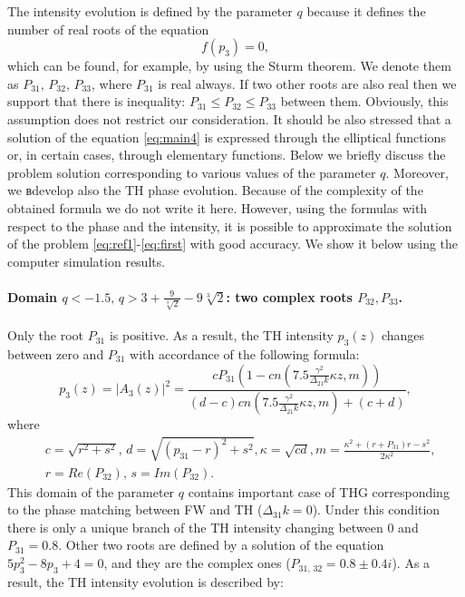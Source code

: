 \documentclass[a4paper, 12pt, onecolumn]{extarticle}
\begin{document}
The intensity evolution is defined by the parameter $q$ because it defines the number of real roots of the equation
$$
f(p_3)=0,
$$
which can be found, for example, by using the Sturm theorem. We  denote them as
$P_{31},\,P_{32},\,P_{33}$, where $P_{31}$ is  real always. If two other roots are also real then we support that there is inequality:   $P_{31}\le P_{32}\le P_{33}$ between them. Obviously, this   assumption does not restrict our consideration.
It should be also stressed that a solution of the equation \eqref{eq:main4} is expressed through the elliptical functions or, in certain cases, through elementary functions. Below we briefly discuss the problem  solution corresponding to various values of the parameter $q$.
Moreover, we вdevelop also the TH phase evolution. Because of the complexity of the obtained formula we do not write it here. However, using the formulas with respect to the phase and the intensity, it is possible to approximate the solution of the problem \eqref{eq:ref1}-\eqref{eq:first} with good accuracy. We show it below using the computer simulation results.

\paragraph*{Domain  $q<-1.5,\,q>3 + \frac{9}{\sqrt[3]{2}}-9\sqrt[3]{ 2}$: two complex roots $P_{32},P_{33}$.}
Only the root $P_{31}$ is positive. As a result, the TH intensity  $p_3(z)$ changes between zero and $P_{31}$ with accordance of the following formula:
\begin{equation}
\label{eq:p1_1}
p_3(z)=|A_3(z)|^2=\frac{cP_{31}(1-cn(7.5\frac{\gamma^2}{\Delta_{21}k}\kappa z,m))}{(d-c)cn(7.5\frac{\gamma^2}{\Delta_{21}k}\kappa z,
m)+(c+d)},
\end{equation}
where
$$
\begin{aligned}
&c=\sqrt{r^2+s^2},\, d=\sqrt{(p_{31}-r)^2+s^2}, \kappa=\sqrt{cd}, m=\frac{\kappa^2+(r+P_{31})r-s^2}{2\kappa^2},\\
&r=Re(P_{32}),\, s=Im (P_{32}).
\end{aligned}
$$
This domain of the parameter $q$ contains important case of THG corresponding to the phase matching between FW and TH ($\Delta_{31}k=0$). Under this condition there is only a unique branch of the TH intensity changing between \(0\) and $P_{31}=0.8$. Other two roots are defined by a solution of the equation \(5p_3^2-8p_3+4=0\), and they are the complex ones (\(P_{31,\,32}=0.8\pm0.4i\)). 
As a result, the TH intensity evolution  is described by:
\end{document}
